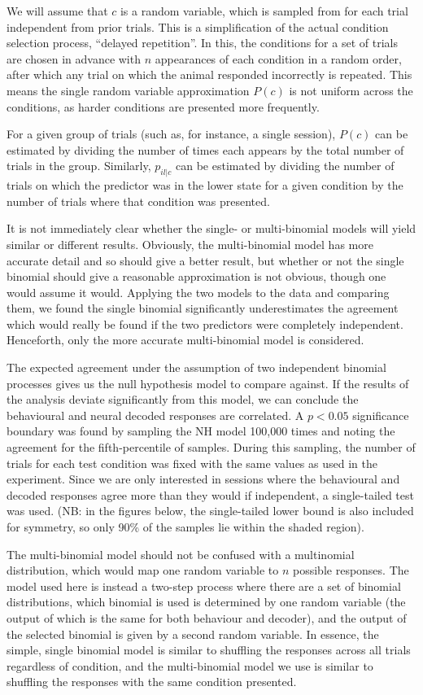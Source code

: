 We will assume that $c$ is a random variable, which is sampled from for each trial independent from prior trials. This is a simplification of the actual condition selection process, ``delayed repetition''. In this, the conditions for a set of trials are chosen in advance with $n$ appearances of each condition in a random order, after which any trial on which the animal responded incorrectly is repeated. This means the single random variable approximation $P(c)$ is not uniform across the conditions, as harder conditions are presented more frequently.

For a given group of trials (such as, for instance, a single session), $P(c)$ can be estimated by dividing the number of times each appears by the total number of trials in the group. Similarly, $p_{il|c}$ can be estimated by dividing the number of trials on which the predictor was in the lower state for a given condition by the number of trials where that condition was presented.

It is not immediately clear whether the single- or multi-binomial models will yield similar or different results. Obviously, the multi-binomial model has more accurate detail and so should give a better result, but whether or not the single binomial should give a reasonable approximation is not obvious, though one would assume it would.
Applying the two models to the data and comparing them, we found the single binomial significantly underestimates the agreement which would really be found if the two predictors were completely independent. Henceforth, only the more accurate multi-binomial model is considered.

The expected agreement under the assumption of two independent binomial processes gives us the null hypothesis model to compare against. If the results of the analysis deviate significantly from this model, we can conclude the behavioural and neural decoded responses are correlated. A $p<0.05$ significance boundary was found by sampling the NH model 100,000 times and noting the agreement for the fifth-percentile of samples. During this sampling, the number of trials for each test condition was fixed with the same values as used in the experiment. Since we are only interested in sessions where the behavioural and decoded responses agree more than they would if independent, a single-tailed test was used. (NB: in the figures below, the single-tailed lower bound is also included for symmetry, so only 90\% of the samples lie within the shaded region).

The multi-binomial model should not be confused with a multinomial distribution, which would map one random variable to $n$ possible responses. The model used here is instead a two-step process where there are a set of binomial distributions, which binomial is used is determined by one random variable (the output of which is the same for both behaviour and decoder), and the output of the selected binomial is given by a second random variable. In essence, the simple, single binomial model is similar to shuffling the responses across all trials regardless of condition, and the multi-binomial model we use is similar to shuffling the responses with the same condition presented.


